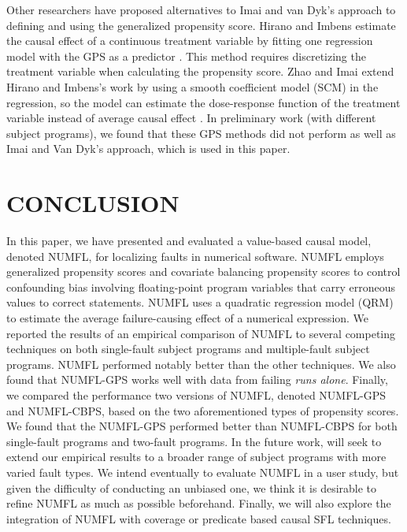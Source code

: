 \documentclass[times]{stvrauth}
\begin{document}
Other researchers have proposed alternatives to Imai and van Dyk's approach to defining and using the generalized propensity score.  Hirano and Imbens estimate the causal effect of a continuous treatment variable by fitting one regression model with the GPS as a predictor \cite{Hirano2004}. This method requires discretizing the treatment variable when calculating the propensity score.  Zhao and Imai extend Hirano and Imbens's work by using a smooth coefficient model (SCM) in the regression, so the model can estimate the dose-response function of the treatment variable instead of average causal effect \cite{Zhao2013}.  In preliminary work (with different subject programs), we found that these GPS methods did not perform as well as Imai and Van Dyk's approach, which is used in this paper.


\section{CONCLUSION}\label{conclusion}
In this paper, we have presented and evaluated a value-based causal model, denoted NUMFL, for localizing faults in numerical software. NUMFL employs generalized propensity scores and covariate balancing propensity scores to control confounding bias involving floating-point program variables that carry erroneous values to correct statements.  NUMFL uses a quadratic regression model (QRM) to estimate the average failure-causing effect of a numerical expression.  We reported the results of an empirical comparison of NUMFL to several competing techniques on both single-fault subject programs and multiple-fault subject programs.  NUMFL performed notably better than the other techniques. We also found that NUMFL-GPS works well with data from failing {\it runs alone}.  Finally, we compared the performance two versions of NUMFL, denoted NUMFL-GPS and NUMFL-CBPS, based on the two aforementioned types of propensity scores. We found that the NUMFL-GPS performed better than NUMFL-CBPS for both single-fault programs and two-fault programs.   In the future work, will seek to extend our empirical results to a broader range of subject programs with more varied fault types.  We intend eventually to evaluate NUMFL in a user study, but given the difficulty of conducting an unbiased one, we think it is desirable to refine NUMFL as much as possible beforehand.  Finally, we will also explore the integration of NUMFL with coverage or predicate based causal SFL techniques.

%
%
%
\end{document}
